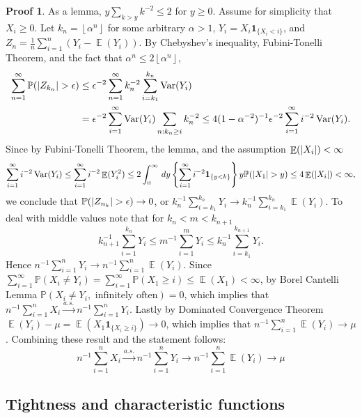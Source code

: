 \documentclass[hidelinks,11pt]{article}
\theoremstyle{definition}
\theoremstyle{dotless}
\newtheorem{prop}{Proof}[section]
\theoremstyle{remark}
\DeclareMathOperator{\Var}{Var}
\DeclareMathOperator{\E}{\mathbb{E}}
\DeclareMathOperator{\1}{\mathbf{1}}
\begin{document}
\begin{prop}
As a lemma, $y\sum_{k>y}k^{-2}\leq2$ for $y\geq0$.\medbreak
Assume for simplicity that $X_i\geq0$. Let $k_n=\left\lfloor{\alpha^n}\right\rfloor$ for some arbitrary $\alpha>1$, $Y_i=X_i\textbf{1}_{\{X_i<i\}}$, and $Z_n=\frac{1}{n}\sum_{i=1}^n(Y_i-\E(Y_i))$.\medbreak
By Chebyshev's inequality,  Fubini-Tonelli Theorem, and the fact that $\alpha^n\leq2\left\lfloor{\alpha^n}\right\rfloor$,
\begin{align*}
\sum_{n=1}^\infty\mathbb{P}(\abs{Z_{k_n}}>\epsilon)&\leq\epsilon^{-2}\sum_{n=1}^\infty k_n^{-2}\sum_{i=k_1}^{k_n}\Var(Y_i)\\
&=\epsilon^{-2}\sum_{i=1}^\infty\Var(Y_i)\sum_{n:k_n\geq i}k_n^{-2}\leq4(1-\alpha^{-2})^{-1}\epsilon^{-2}\sum_{i=1}^\infty i^{-2}\Var(Y_i).
\end{align*}
Since by Fubini-Tonelli Theorem, the lemma, and the assumption $\E(\abs{X_i})<\infty$
\[\sum_{i=1}^\infty i^{-2}\Var(Y_i)\leq\sum_{i=1}^\infty i^{-2}\E(Y_i^2)\leq2\int_0^\infty\,dy\left\{\sum_{i=1}^\infty i^{-2}\textbf{1}_{\{y<k\}}\right\}y\mathbb{P}(\abs{X_1}>y)\leq4\E(\abs{X_i})<\infty,\]
we conclude that $\mathbb{P}(\abs{Z_{n_k}}>\epsilon)\to0$, or $k_n^{-1}\sum_{i=k_1}^{k_n}Y_i\to k_n^{-1}\sum_{i=k_1}^{k_n}\E(Y_i)$. To deal with middle values note that for $k_n<m<k_{n+1}$
\[k_{n+1}^{-1}\sum_{i=1}^{k_n}Y_i\leq m^{-1}\sum_{i=1}^mY_i\leq k_n^{-1}\sum_{i=k_1}^{k_{n+1}}Y_i.\]
Hence $n^{-1}\sum_{i=1}^nY_i\to n^{-1}\sum_{i=1}^n\E(Y_i)$.\medbreak
Since $\sum_{i=1}^\infty\mathbb{P}(X_i\neq Y_i)=\sum_{i=1}^\infty\mathbb{P}(X_1\geq i)\leq\E(X_1)<\infty$, by Borel Cantelli Lemma $\mathbb{P}(X_i\neq Y_i,\textrm{ infinitely often})=0$, which implies that $n^{-1}\sum_{i=1}^nX_i\xrightarrow{a.s.}n^{-1}\sum_{i=1}^nY_i$.\medbreak
Lastly by Dominated Convergence Theorem $\E(Y_i)-\mu=\E(X_1\textbf{1}_{\{X_i\geq i\}})\to0$, which implies that $n^{-1}\sum_{i=1}^n\E(Y_i)\to\mu$. Combining these result and the statement follows:
\[n^{-1}\sum_{i=1}^nX_i\xrightarrow{a.s.}n^{-1}\sum_{i=1}^nY_i\to n^{-1}\sum_{i=1}^n\E(Y_i)\to\mu\]
\end{prop}

\subsection{Tightness and characteristic functions}
\end{document}
